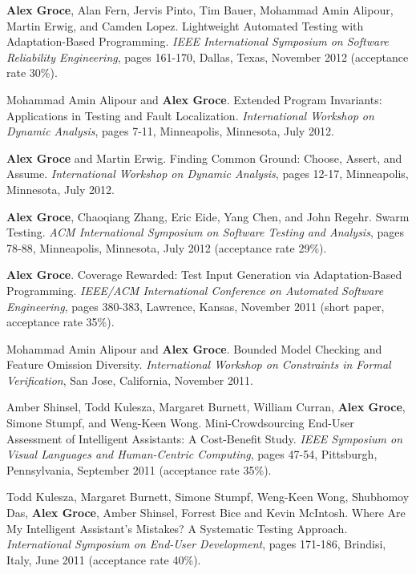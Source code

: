 \documentclass[ComputerScience]{vita}
\begin{document}
\begin{vita}
\begin{Refereed Conference and Workshop Publications}
\item {\bf Alex Groce}, Alan Fern, Jervis Pinto, Tim Bauer, Mohammad Amin Alipour, Martin Erwig, and Camden Lopez.
\newblock Lightweight Automated Testing with Adaptation-Based Programming.
\newblock \emph{IEEE International Symposium on Software Reliability Engineering}, pages 161-170, Dallas, Texas, November 2012 (acceptance rate 30\%).

\item Mohammad Amin Alipour and {\bf Alex Groce}.
\newblock Extended Program Invariants: Applications in Testing and Fault Localization.
\newblock \emph{International Workshop on Dynamic Analysis}, pages 7-11, Minneapolis, Minnesota, July 2012.

\item {\bf Alex Groce} and Martin Erwig.
\newblock Finding Common Ground: Choose, Assert, and Assume.
\newblock \emph{International Workshop on Dynamic Analysis}, pages 12-17, Minneapolis, Minnesota, July 2012.

\item {\bf Alex Groce}, Chaoqiang Zhang, Eric Eide, Yang Chen, and John Regehr.
\newblock Swarm Testing.
\newblock \emph{ACM International Symposium on Software Testing and Analysis}, pages 78-88, Minneapolis, Minnesota, July 2012 (acceptance rate 29\%).

\item {\bf Alex Groce}.
\newblock Coverage Rewarded: Test Input Generation via Adaptation-Based Programming.
\newblock \emph{IEEE/ACM International Conference on Automated Software Engineering}, pages 380-383, Lawrence, Kansas, November 2011 (short paper, acceptance rate 35\%).

\item
Mohammad Amin Alipour and {\bf Alex Groce}.
\newblock Bounded Model Checking and Feature Omission Diversity.
\newblock \emph{International Workshop on Constraints in Formal Verification}, San Jose, California, November 2011.

\item
Amber Shinsel, Todd Kulesza, Margaret Burnett, William Curran, {\bf Alex Groce}, Simone Stumpf, and Weng-Keen Wong.
\newblock Mini-Crowdsourcing End-User Assessment of Intelligent Assistants: A Cost-Benefit Study.
\newblock \emph{IEEE Symposium on Visual Languages and Human-Centric Computing}, pages 47-54, Pittsburgh, Pennsylvania, September 2011 (acceptance rate 35\%).

\item
Todd Kulesza, Margaret Burnett, Simone Stumpf, Weng-Keen Wong, Shubhomoy Das, {\bf Alex Groce}, Amber Shinsel, Forrest Bice and Kevin McIntosh.
\newblock Where Are My Intelligent Assistant's Mistakes?  A Systematic Testing Approach.
\newblock \emph{International Symposium on End-User Development}, pages 171-186, Brindisi, Italy, June 2011 (acceptance rate 40\%).


\end{Refereed Conference and Workshop Publications}
\end{vita}
\end{document}
